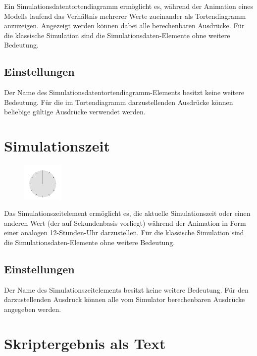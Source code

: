 Ein Simulationsdatentortendiagramm ermöglicht es, während der Animation eines Modells laufend 
das Verhältnis mehrerer Werte zueinander als Tortendiagramm anzuzeigen.
Angezeigt werden können dabei alle berechenbaren Ausdrücke. Für die klassische Simulation sind die
Simulationsdaten-Elemente ohne weitere Bedeutung.

\subsection*{Einstellungen}

Der Name des Simulationsdatentortendiagramm-Elements besitzt keine weitere Bedeutung. Für die im
Tortendiagramm darzustellenden Ausdrücke können beliebige gültige Ausdrücke verwendet werden.


\section{Simulationszeit}
\label{ref:ModelElementAnimationClock}

\begin{figure}
\vspace{-22pt}
\includegraphics[width=2cm]{imageModelElementAnimationClock.png}
\vspace{-22pt}
\end{figure}

Das Simulationszeitelement ermöglicht es, die aktuelle Simulationszeit oder einen anderen Wert
(der auf Sekundenbasis vorliegt) während der Animation in Form einer analogen 12-Stunden-Uhr darzustellen.
Für die klassische Simulation sind die Simulationsdaten-Elemente ohne weitere Bedeutung.

\subsection*{Einstellungen}

Der Name des Simulationszeitelements besitzt keine weitere Bedeutung.
Für den darzustellenden Ausdruck können alle vom Simulator berechenbaren Ausdrücke angegeben werden.


\section{Skriptergebnis als Text}
\label{ref:ModelElementAnimationTextJS}

